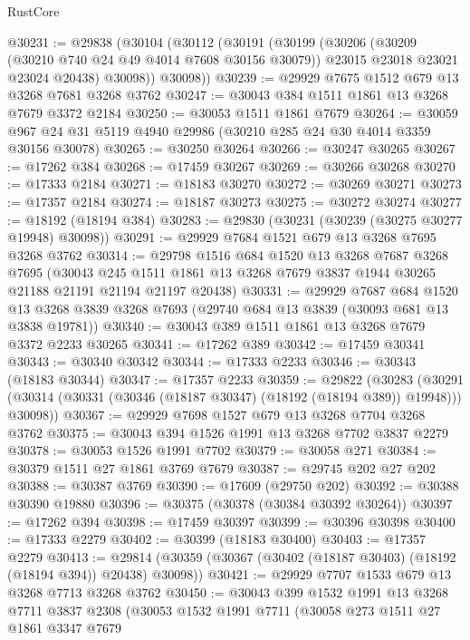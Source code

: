 \begin{lexlean}{RustCore}
\begin{coremodule}
@30231 := @29838
    (@30104
      (@30112
        (@30191
          (@30199
            (@30206
              (@30209 (@30210 @740 @24 @49 @4014 @7608 @30156 @30079))
              @23015
              @23018
              @23021
              @23024
              @20438)
            @30098))
        @30098))
@30239 := @29929 @7675 @1512 @679 @13 @3268 @7681 @3268 @3762
@30247 := @30043 @384 @1511 @1861 @13 @3268 @7679 @3372 @2184
@30250 := @30053 @1511 @1861 @7679
@30264 := @30059 @967 @24 @31 @5119 @4940 @29986 (@30210 @285 @24 @30 @4014 @3359 @30156 @30078)
@30265 := @30250 @30264
@30266 := @30247 @30265
@30267 := @17262 @384
@30268 := @17459 @30267
@30269 := @30266 @30268
@30270 := @17333 @2184
@30271 := @18183 @30270
@30272 := @30269 @30271
@30273 := @17357 @2184
@30274 := @18187 @30273
@30275 := @30272 @30274
@30277 := @18192 (@18194 @384)
@30283 := @29830 (@30231 (@30239 (@30275 @30277 @19948) @30098))
@30291 := @29929 @7684 @1521 @679 @13 @3268 @7695 @3268 @3762
@30314 := @29798
    @1516
    @684
    @1520
    @13
    @3268
    @7687
    @3268
    @7695
    (@30043 @245 @1511 @1861 @13 @3268 @7679 @3837 @1944 @30265 @21188 @21191 @21194 @21197 @20438)
@30331 := @29929
    @7687
    @684
    @1520
    @13
    @3268
    @3839
    @3268
    @7693
    (@29740 @684 @13 @3839 (@30093 @681 @13 @3838 @19781))
@30340 := @30043 @389 @1511 @1861 @13 @3268 @7679 @3372 @2233 @30265
@30341 := @17262 @389
@30342 := @17459 @30341
@30343 := @30340 @30342
@30344 := @17333 @2233
@30346 := @30343 (@18183 @30344)
@30347 := @17357 @2233
@30359 := @29822
    (@30283
      (@30291 (@30314 (@30331 (@30346 (@18187 @30347) (@18192 (@18194 @389)) @19948))) @30098))
@30367 := @29929 @7698 @1527 @679 @13 @3268 @7704 @3268 @3762
@30375 := @30043 @394 @1526 @1991 @13 @3268 @7702 @3837 @2279
@30378 := @30053 @1526 @1991 @7702
@30379 := @30058 @271
@30384 := @30379 @1511 @27 @1861 @3769 @7679
@30387 := @29745 @202 @27 @202
@30388 := @30387 @3769
@30390 := @17609 (@29750 @202)
@30392 := @30388 @30390 @19880
@30396 := @30375 (@30378 (@30384 @30392 @30264))
@30397 := @17262 @394
@30398 := @17459 @30397
@30399 := @30396 @30398
@30400 := @17333 @2279
@30402 := @30399 (@18183 @30400)
@30403 := @17357 @2279
@30413 := @29814 (@30359 (@30367 (@30402 (@18187 @30403) (@18192 (@18194 @394)) @20438) @30098))
@30421 := @29929 @7707 @1533 @679 @13 @3268 @7713 @3268 @3762
@30450 := @30043
    @399
    @1532
    @1991
    @13
    @3268
    @7711
    @3837
    @2308
    (@30053
      @1532
      @1991
      @7711
      (@30058
        @273
        @1511
        @27
        @1861
        @3347
        @7679

\end{coremodule}
\end{lexlean}
